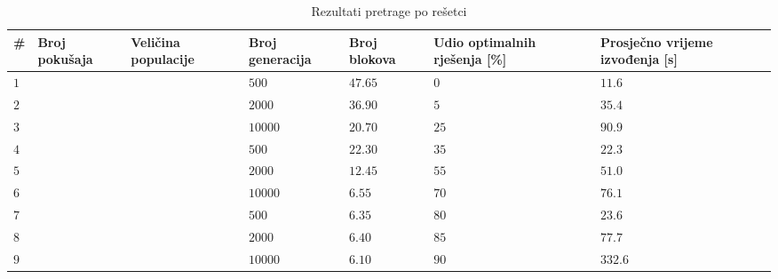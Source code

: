 \documentclass[times, utf8, diplomski]{fer}
\begin{document}
\begin{table}
	\centering
	\caption{Rezultati pretrage po rešetci}
	\label{tab:grid-search-results}
	\begin{tabular}{
			|>{\centering\arraybackslash}m{4mm}
			|>{\centering\arraybackslash}m{19mm}
			|>{\centering\arraybackslash}m{19mm}
			|>{\centering\arraybackslash}m{19mm}
			|>{\centering\arraybackslash}m{18mm}
			|>{\centering\arraybackslash}m{20mm}
			|>{\centering\arraybackslash}m{18mm}|}
		\hline
		  \textbf{\#}
		& \textbf{Broj \linebreak pokušaja}
		& \textbf{Veličina \linebreak populacije}
		& \textbf{Broj \linebreak generacija}
		& \textbf{Broj \linebreak blokova}
		& \textbf{Udio \linebreak optimalnih \linebreak rješenja [\%]}
		& \textbf{Prosječno vrijeme izvođenja [s]} \\ \hline
		
		$1$		& \multirow{9}{*}{$1$}	& \multirow{3}{*}{$50$}		& $500$		& $47.65$	& $0$		& $11.6$	\\ \cline{1-1} \cline{4-7}
		$2$		&						& 							& $2000$	& $36.90$	& $5$		& $35.4$	\\ \cline{1-1} \cline{4-7}
		$3$		&						&							& $10000$	& $20.70$	& $25$		& $90.9$	\\ \cline{1-1} \cline{3-7}
		$4$		&						& \multirow{3}{*}{$200$}	& $500$		& $22.30$	& $35$		& $22.3$	\\ \cline{1-1} \cline{4-7}
		$5$		&						&							& $2000$	& $12.45$	& $55$		& $51.0$	\\ \cline{1-1} \cline{4-7}
		$6$		&						&							& $10000$	& $6.55$	& $70$		& $76.1$	\\ \cline{1-1} \cline{3-7}
		$7$		&						& \multirow{3}{*}{$1000$}	& $500$		& $6.35$	& $80$		& $23.6$	\\ \cline{1-1} \cline{4-7}
		$8$		&						&							& $2000$	& $6.40$	& $85$		& $77.7$	\\ \cline{1-1} \cline{4-7}
		$9$		&						&							& $10000$	& $6.10$	& $90$		& $332.6$	\\ \hline
		

\end{tabular}
\end{table}
\end{document}
